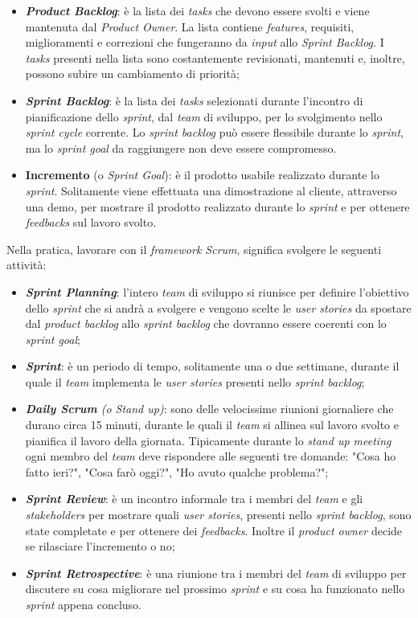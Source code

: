 \begin{itemize}
  \item \textbf{\emph{Product Backlog}}: è la lista dei \emph{tasks} che devono essere svolti e viene mantenuta dal \emph{Product Owner}. La lista contiene \emph{features}, requisiti, miglioramenti e correzioni che fungeranno da \emph{input} allo \emph{Sprint Backlog}. I \emph{tasks} presenti nella lista sono costantemente revisionati, mantenuti e, inoltre, possono subire un cambiamento di priorità; 
  \item \textbf{\emph{Sprint Backlog}}: è la lista dei \emph{tasks} selezionati durante l'incontro di pianificazione dello \emph{sprint}, dal \emph{team} di sviluppo, per lo svolgimento nello \emph{sprint cycle} corrente. Lo \emph{sprint backlog} può essere flessibile durante lo \emph{sprint}, ma lo \emph{sprint goal} da raggiungere non deve essere compromesso.
  \item \textbf{Incremento} (o \emph{Sprint Goal}): è il prodotto usabile realizzato durante lo \emph{sprint}. Solitamente viene effettuata una dimostrazione al cliente, attraverso una demo, per mostrare il prodotto realizzato durante lo \emph{sprint} e per ottenere \emph{feedbacks} sul lavoro svolto.
\end{itemize}

Nella pratica, lavorare con il \emph{framework Scrum}, significa svolgere le seguenti attività:
\begin{itemize}
  \item \textbf{\emph{Sprint Planning}}: l'intero \emph{team} di sviluppo si riunisce per definire l'obiettivo dello \emph{sprint} che si andrà a svolgere e vengono scelte le \emph{user stories} da spostare dal \emph{product backlog} allo \emph{sprint backlog} che dovranno essere coerenti con lo \emph{sprint goal};
  \item \textbf{\emph{Sprint}}: è un periodo di tempo, solitamente una o due settimane, durante il quale il \emph{team} implementa le \emph{user stories} presenti nello \emph{sprint backlog};
  \item \emph{\textbf{Daily Scrum} (o Stand up)}: sono delle velocissime riunioni giornaliere che durano circa 15 minuti, durante le quali il \emph{team} si allinea sul lavoro svolto e pianifica il lavoro della giornata. Tipicamente durante lo \emph{stand up meeting} ogni membro del \emph{team} deve rispondere alle seguenti tre domande: "Cosa ho fatto ieri?", "Cosa farò oggi?", "Ho avuto qualche problema?";
  \item \textbf{\emph{Sprint Review}}: è un incontro informale tra i membri del \emph{team} e gli \emph{\glspl{stakeholder}} per mostrare quali \emph{user stories}, presenti nello \emph{sprint backlog}, sono state completate e per ottenere dei \emph{feedbacks}. Inoltre il \emph{product owner} decide se rilasciare l'incremento o no;
  \item \textbf{\emph{Sprint Retrospective}}: è una riunione tra i membri del \emph{team} di sviluppo per discutere su cosa migliorare nel prossimo \emph{sprint} e su cosa ha funzionato nello \emph{sprint} appena concluso.
\end{itemize}

